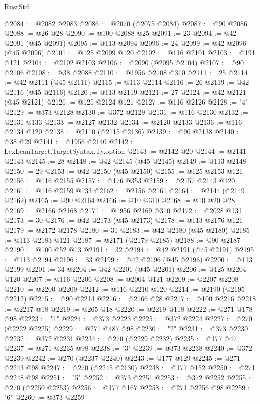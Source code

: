 \begin{lexlean}{RustStd}
\begin{coremodule}
@2084 := @2082 @2083
@2086 := @2070 (@2075 @2084)
@2087 := @90 @2086
@2088 := @26 @28
@2090 := @100 @2088 @25
@2091 := 23
@2094 := @42 @2091 (@45 @2091)
@2095 := @113 @2094
@2096 := 24
@2099 := @42 @2096 (@45 @2096)
@2101 := @125 @2099 @120
@2102 := @116 @2101
@2103 := @191 @121
@2104 := @2102 @2103
@2106 := @2090 (@2095 @2104)
@2107 := @90 @2106
@2108 := @38 @2088
@2110 := @1956 @2108 @310
@2111 := 25
@2114 := @42 @2111 (@45 @2111)
@2115 := @113 @2114
@2116 := 26
@2119 := @42 @2116 (@45 @2116)
@2120 := @113 @2119
@2121 := 27
@2124 := @42 @2121 (@45 @2121)
@2126 := @125 @2124 @121
@2127 := @116 @2126
@2128 := "4"
@2129 := @373 @2128
@2130 := @372 @2129
@2131 := @116 @2130
@2132 := @2131 @133
@2133 := @2127 @2132
@2134 := @2120 @2133
@2136 := @116 @2134 @120
@2138 := @2110 (@2115 @2136)
@2139 := @90 @2138
@2140 := @38 @29
@2141 := @1956 @2140
@2142 := LexLeanTarget.TargetSyntax.Ty.option
@2143 := @2142 @20
@2144 := @2141 @2143
@2145 := 28
@2148 := @42 @2145 (@45 @2145)
@2149 := @113 @2148
@2150 := 29
@2153 := @42 @2150 (@45 @2150)
@2155 := @125 @2153 @121
@2156 := @116 @2155
@2157 := @176 @353
@2159 := @2157 @2143 @120
@2161 := @116 @2159 @133
@2162 := @2156 @2161
@2164 := @2144 (@2149 @2162)
@2165 := @90 @2164
@2166 := @10 @310
@2168 := @10 @20 @28
@2169 := @2166 @2168
@2171 := @1956 @2169 @310
@2172 := @2028 @131
@2173 := 30
@2176 := @42 @2173 (@45 @2173)
@2178 := @113 @2176 @121
@2179 := @2172 @2178
@2180 := 31
@2183 := @42 @2180 (@45 @2180)
@2185 := @113 @2183 @121
@2187 := @2171 (@2179 @2185)
@2188 := @90 @2187
@2190 := @100 @52 @13
@2191 := 32
@2194 := @42 @2191 (@45 @2191)
@2195 := @113 @2194
@2196 := 33
@2199 := @42 @2196 (@45 @2196)
@2200 := @113 @2199
@2201 := 34
@2204 := @42 @2201 (@45 @2201)
@2206 := @125 @2204 @120
@2207 := @116 @2206
@2208 := @2004 @121
@2209 := @2207 @2208
@2210 := @2200 @2209
@2212 := @116 @2210 @120
@2214 := @2190 (@2195 @2212)
@2215 := @90 @2214
@2216 := @2166 @28
@2217 := @100 @2216
@2218 := @2217 @18
@2219 := @265 @18
@2220 := @2219 @118
@2222 := @271 @178 @98
@2223 := "1"
@2224 := @373 @2223
@2225 := @372 @2224
@2227 := @270 (@2222 @2225)
@2229 := @271 @487 @98
@2230 := "2"
@2231 := @373 @2230
@2232 := @372 @2231
@2234 := @270 (@2229 @2232)
@2235 := @177 @47
@2237 := @271 @2235 @98
@2238 := "3"
@2239 := @373 @2238
@2240 := @372 @2239
@2242 := @270 (@2237 @2240)
@2243 := @177 @129
@2245 := @271 @2243 @98
@2247 := @270 (@2245 @2130)
@2248 := @177 @152
@2250 := @271 @2248 @98
@2251 := "5"
@2252 := @373 @2251
@2253 := @372 @2252
@2255 := @270 (@2250 @2253)
@2256 := @177 @167
@2258 := @271 @2256 @98
@2259 := "6"
@2260 := @373 @2259

\end{coremodule}
\end{lexlean}

